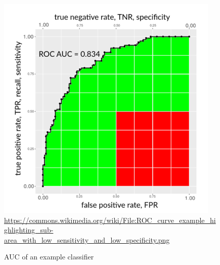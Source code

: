 \begin{figure}
\centering
\includegraphics[width=.65\textwidth]{auc.png}
\scriptsize \url{https://commons.wikimedia.org/wiki/File:ROC_curve_example_highlighting_sub-area_with_low_sensitivity_and_low_specificity.png}

\caption{AUC of an example classifier}
\label{fig:auc}
\end{figure}

